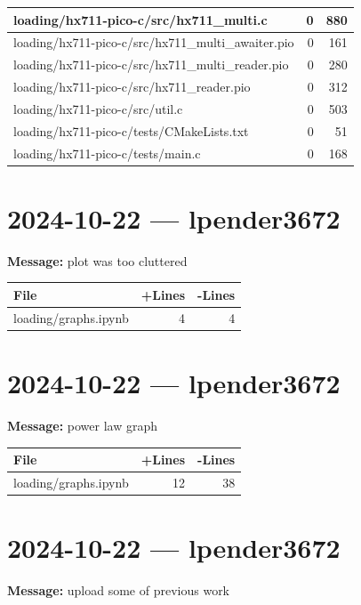 \documentclass{article}
\begin{document}
\begin{longtable}{|p{10cm}|r|r|}
\hline
loading/hx711-pico-c/src/hx711\_multi.c & 0 & 880 \\
\hline
loading/hx711-pico-c/src/hx711\_multi\_awaiter.pio & 0 & 161 \\
\hline
loading/hx711-pico-c/src/hx711\_multi\_reader.pio & 0 & 280 \\
\hline
loading/hx711-pico-c/src/hx711\_reader.pio & 0 & 312 \\
\hline
loading/hx711-pico-c/src/util.c & 0 & 503 \\
\hline
loading/hx711-pico-c/tests/CMakeLists.txt & 0 & 51 \\
\hline
loading/hx711-pico-c/tests/main.c & 0 & 168 \\
\hline
\end{longtable}

\section*{2024-10-22 --- lpender3672}
\textbf{Message:} plot was too cluttered

\begin{longtable}{|p{10cm}|r|r|}
\hline \textbf{File} & \textbf{+Lines} & \textbf{-Lines} \\
\hline
loading/graphs.ipynb & 4 & 4 \\
\hline
\end{longtable}

\section*{2024-10-22 --- lpender3672}
\textbf{Message:} power law graph

\begin{longtable}{|p{10cm}|r|r|}
\hline \textbf{File} & \textbf{+Lines} & \textbf{-Lines} \\
\hline
loading/graphs.ipynb & 12 & 38 \\
\hline
\end{longtable}

\section*{2024-10-22 --- lpender3672}
\textbf{Message:} upload some of previous work
\end{document}
